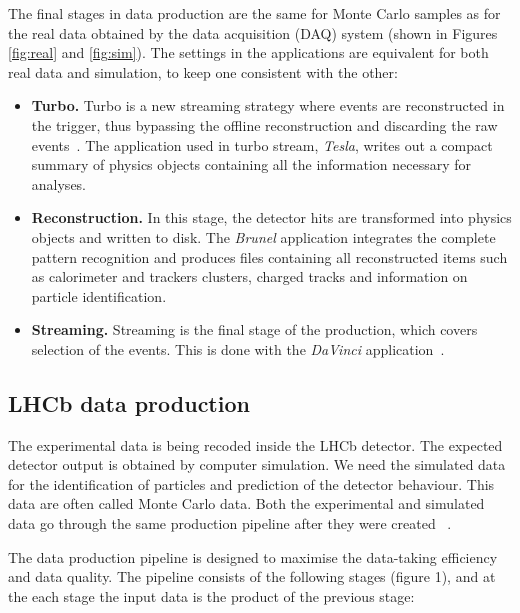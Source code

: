 The final stages in data production are the same for Monte Carlo samples as for the real data obtained by the data acquisition (DAQ) system (shown in Figures  \ref{fig:real} and \ref{fig:sim}). The settings in the applications are equivalent for both real data and simulation, to keep one consistent with the other:

\begin{itemize}
    \item \textbf{Turbo.} Turbo is a new streaming strategy where events are reconstructed in the trigger, thus bypassing the offline reconstruction and discarding the raw events~\cite{benson2015lhcb}. The application used in turbo stream, {\it Tesla}, writes out a compact summary of physics objects containing all the information necessary for analyses. 
    \item \textbf{Reconstruction.} In this stage, the detector hits are transformed into physics objects and written to disk. The {\it Brunel} application integrates the complete pattern recognition and produces files containing all reconstructed items such as calorimeter and trackers clusters, charged tracks and information on particle identification.
    \item \textbf{Streaming.} Streaming is the final stage of the production, which covers selection of the events. This is done with the {\it DaVinci} application~\cite{corti2006software}. 
\end{itemize}


\iffalse 
\subsection{LHCb data production}

The experimental data is being recoded inside the LHCb detector. The expected detector output is obtained by computer simulation. We need the simulated data for the identification of particles and prediction of the detector behaviour. This data are often called Monte Carlo data. Both the experimental and simulated data go through the same production pipeline after they were created ~\cite{corti2006software}.

The data production pipeline is designed to maximise the data-taking efficiency and data quality. The pipeline consists of the following stages (figure 1), and at the each stage the input data is the product of the previous stage:

